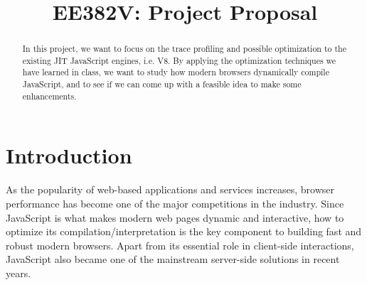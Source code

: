 \documentclass[conference]{IEEEtran}
\begin{document}
\title{EE382V: Project Proposal}

\author{
\and
{}
}

\maketitle

\begin{abstract}
In this project, we want to focus on the trace profiling and possible optimization to the existing JIT JavaScript engines, i.e. V8. By applying the optimization techniques we have learned in class, we want to study how modern browsers dynamically compile JavaScript, and to see if we can come up with a feasible idea to make some enhancements.

\end{abstract}

\section{Introduction}
As the popularity of web-based applications and services increases, browser performance has become one of the major competitions in the industry. Since JavaScript is what makes modern web pages dynamic and interactive, how to optimize its compilation/interpretation is the key component to building fast and robust modern browsers. Apart from its essential role in client-side interactions, JavaScript also became one of the mainstream server-side solutions in recent years\cite{node}. 
\end{document}
